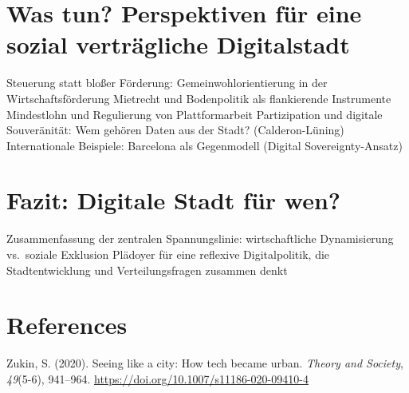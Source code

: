 \documentclass[
]{agujournal2019}
\newlength{\cslhangindent}
\newenvironment{CSLReferences}[2] %
 {\begin{list}{}{%
  \setlength{\itemindent}{0pt}
  \setlength{\leftmargin}{0pt}
  \setlength{\parsep}{0pt}
  \ifodd #1
   \setlength{\leftmargin}{\cslhangindent}
   \setlength{\itemindent}{-1\cslhangindent}
  \fi
  \setlength{\itemsep}{#2\baselineskip}}}
 {\end{list}}
\begin{document}
\section{Was tun? Perspektiven für eine sozial verträgliche
Digitalstadt}\label{was-tun-perspektiven-fuxfcr-eine-sozial-vertruxe4gliche-digitalstadt}

Steuerung statt bloßer Förderung: Gemeinwohlorientierung in der
Wirtschaftsförderung Mietrecht und Bodenpolitik als flankierende
Instrumente Mindestlohn und Regulierung von Plattformarbeit
Partizipation und digitale Souveränität: Wem gehören Daten aus der
Stadt? (Calderon-Lüning) Internationale Beispiele: Barcelona als
Gegenmodell (Digital Sovereignty-Ansatz)

\section{Fazit: Digitale Stadt für
wen?}\label{fazit-digitale-stadt-fuxfcr-wen}

Zusammenfassung der zentralen Spannungslinie: wirtschaftliche
Dynamisierung vs.~soziale Exklusion Plädoyer für eine reflexive
Digitalpolitik, die Stadtentwicklung und Verteilungsfragen zusammen
denkt

\section*{References}\label{references}

\protect{}\label{refs}
\begin{CSLReferences}{1}{0}
\vspace{1em}

Zukin, S. (2020). Seeing like a city: How tech became urban.
\emph{Theory and Society}, \emph{49}(5-6), 941--964.
\url{https://doi.org/10.1007/s11186-020-09410-4}

\end{CSLReferences}
\end{document}
